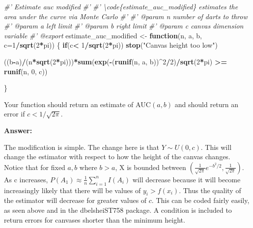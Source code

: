\documentclass[
]{article}
\newenvironment{Shaded}{\begin{snugshade}}{\end{snugshade}}
\newcommand{\CommentTok}[1]{\textcolor[rgb]{0.56,0.35,0.01}{\textit{#1}}}
\newcommand{\ControlFlowTok}[1]{\textcolor[rgb]{0.13,0.29,0.53}{\textbf{#1}}}
\newcommand{\DataTypeTok}[1]{\textcolor[rgb]{0.13,0.29,0.53}{#1}}
\newcommand{\DecValTok}[1]{\textcolor[rgb]{0.00,0.00,0.81}{#1}}
\newcommand{\KeywordTok}[1]{\textcolor[rgb]{0.13,0.29,0.53}{\textbf{#1}}}
\newcommand{\NormalTok}[1]{#1}
\newcommand{\OperatorTok}[1]{\textcolor[rgb]{0.81,0.36,0.00}{\textbf{#1}}}
\newcommand{\StringTok}[1]{\textcolor[rgb]{0.31,0.60,0.02}{#1}}
\begin{document}
\begin{Shaded}
\begin{Highlighting}[]
\CommentTok{#' Estimate auc modified}
\CommentTok{#' }
\CommentTok{#' \textbackslash{}code\{estimate_auc_modified\} estimates the area under the curve via Monte Carlo}
\CommentTok{#' }
\CommentTok{#' @param n number of darts to throw}
\CommentTok{#' @param a left limit}
\CommentTok{#' @param b right limit}
\CommentTok{#' @param c canvas dimension variable}
\CommentTok{#' @export}
\NormalTok{estimate_auc_modified <-}\StringTok{ }\ControlFlowTok{function}\NormalTok{(n, a, b, }\DataTypeTok{c=}\DecValTok{1}\OperatorTok{/}\KeywordTok{sqrt}\NormalTok{(}\DecValTok{2}\OperatorTok{*}\NormalTok{pi)) \{}
\ControlFlowTok{if}\NormalTok{(c}\OperatorTok{<}\StringTok{ }\DecValTok{1}\OperatorTok{/}\KeywordTok{sqrt}\NormalTok{(}\DecValTok{2}\OperatorTok{*}\NormalTok{pi)) }\KeywordTok{stop}\NormalTok{(}\StringTok{"Canvas height too low"}\NormalTok{)}
  
\NormalTok{  ((b}\OperatorTok{-}\NormalTok{a)}\OperatorTok{/}\NormalTok{(n}\OperatorTok{*}\KeywordTok{sqrt}\NormalTok{(}\DecValTok{2}\OperatorTok{*}\NormalTok{pi)))}\OperatorTok{*}\KeywordTok{sum}\NormalTok{(}\KeywordTok{exp}\NormalTok{(}\OperatorTok{-}\NormalTok{(}\KeywordTok{runif}\NormalTok{(n, a, b))}\OperatorTok{^}\DecValTok{2}\OperatorTok{/}\DecValTok{2}\NormalTok{)}\OperatorTok{/}\KeywordTok{sqrt}\NormalTok{(}\DecValTok{2}\OperatorTok{*}\NormalTok{pi) }
                           \OperatorTok{>=}\StringTok{ }\KeywordTok{runif}\NormalTok{(n, }\DecValTok{0}\NormalTok{, c))}
  
\NormalTok{\}}
\end{Highlighting}
\end{Shaded}

Your function should return an estimate of \(\text{AUC}(a,b)\) and
should return an error if \(c < 1/\sqrt{2\pi}\).

\textbf{Answer:}

The modification is simple. The change here is that \(Y \sim U(0,c)\).
This will change the estimator with respect to how the height of the
canvas changes. Notice that for fixed \(a,b\) where \(b>a\), X is
bounded between
\((\frac{1}{\sqrt{2\pi}}e^{-b^2/2}, \frac{1}{\sqrt{2\pi}})\). As c
increases, \(P(A_1) \approx \frac{1}{n}\sum_{i=1}^nI(A_i)\) will
decrease because it will become increasingly likely that there will be
values of \(y_i>f(x_i)\). Thus the quality of the estimator will
decrease for greater values of \(c\). This can be coded fairly easily,
as seen above and in the dbelsheiST758 package. A condition is included
to return errors for canvases shorter than the minimum height.
\end{document}
